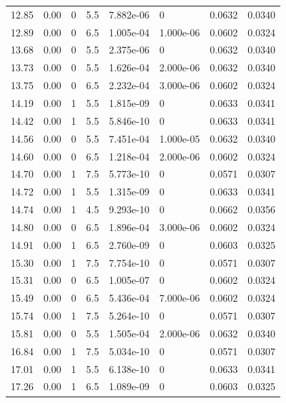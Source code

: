 \documentclass[preview]{standalone}
\begin{document}
{{{\begin{tabular}{L{1.2cm}C{1.2cm} C{0.3cm}C{0.5cm} C{1.4cm}C{1.4cm} C{1.4cm}C{1.4cm}}
  12.85  &  0.00  & 0     & 5.5 &  7.882e-06  & 0  & 0.0632 &  0.0340   \\ 
  12.89  &  0.00  & 0     & 6.5 &  1.005e-04  & 1.000e-06  & 0.0602 &  0.0324   \\ 
  13.68  &  0.00  & 0     & 5.5 &  2.375e-06  & 0  & 0.0632 &  0.0340   \\ 
  13.73  &  0.00  & 0     & 5.5 &  1.626e-04  & 2.000e-06  & 0.0632 &  0.0340   \\ 
  13.75  &  0.00  & 0     & 6.5 &  2.232e-04  & 3.000e-06  & 0.0602 &  0.0324   \\ 
  14.19  &  0.00  & 1     & 5.5 &  1.815e-09  & 0  & 0.0633 &  0.0341   \\ 
  14.42  &  0.00  & 1     & 5.5 &  5.846e-10  & 0  & 0.0633 &  0.0341   \\ 
  14.56  &  0.00  & 0     & 5.5 &  7.451e-04  & 1.000e-05  & 0.0632 &  0.0340   \\ 
  14.60  &  0.00  & 0     & 6.5 &  1.218e-04  & 2.000e-06  & 0.0602 &  0.0324   \\ 
  14.70  &  0.00  & 1     & 7.5 &  5.773e-10  & 0  & 0.0571 &  0.0307   \\ 
  14.72  &  0.00  & 1     & 5.5 &  1.315e-09  & 0  & 0.0633 &  0.0341   \\ 
  14.74  &  0.00  & 1     & 4.5 &  9.293e-10  & 0  & 0.0662 &  0.0356   \\ 
  14.80  &  0.00  & 0     & 6.5 &  1.896e-04  & 3.000e-06  & 0.0602 &  0.0324   \\ 
  14.91  &  0.00  & 1     & 6.5 &  2.760e-09  & 0  & 0.0603 &  0.0325   \\ 
  15.30  &  0.00  & 1     & 7.5 &  7.754e-10  & 0  & 0.0571 &  0.0307   \\ 
  15.31  &  0.00  & 0     & 6.5 &  1.005e-07  & 0  & 0.0602 &  0.0324   \\ 
  15.49  &  0.00  & 0     & 6.5 &  5.436e-04  & 7.000e-06  & 0.0602 &  0.0324   \\ 
  15.74  &  0.00  & 1     & 7.5 &  5.264e-10  & 0  & 0.0571 &  0.0307   \\ 
  15.81  &  0.00  & 0     & 5.5 &  1.505e-04  & 2.000e-06  & 0.0632 &  0.0340   \\ 
  16.84  &  0.00  & 1     & 7.5 &  5.034e-10  & 0  & 0.0571 &  0.0307   \\ 
  17.01  &  0.00  & 1     & 5.5 &  6.138e-10  & 0  & 0.0633 &  0.0341   \\ 
  17.26  &  0.00  & 1     & 6.5 &  1.089e-09  & 0  & 0.0603 &  0.0325   \\ 

\end{tabular}}}}
\end{document}
